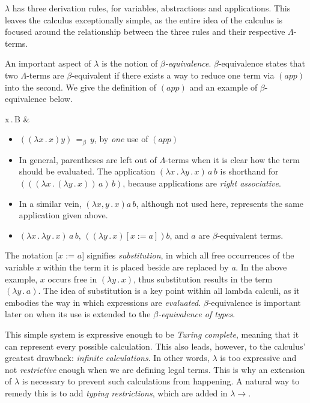 \documentclass[9pt,preprint,nocopyrightspace,computermodern]{sigplanconf} %
\begin{document}
\(\lambda\) has three derivation rules, for variables, abstractions and
applications. This leaves the calculus exceptionally simple, as the
entire idea of the calculus is focused around the relationship between the three
rules and their respective \mbox{\(\Lambda\)-terms.}

An important aspect of \(\lambda\) is the notion of \textit{\(\beta\)-equivalence}.
\(\beta\)-equivalence states that two \(\Lambda\)-terms are \(\beta\)-equivalent
if there exists a way to reduce one term via \((app)\) into the second.
We give the definition of \((app)\) and an example of \(\beta\)-equivalence below.

\begin{center}
        {\Gamma\vdash\lambda x\,.\,B & \Gamma\vdash\Lambda}\par
\end{center}

\begin{itemize}
\item \(((\lambda x\,.\,x)y)\,=_\beta\,y\), by \textit{one} use of \((app)\)
\item In general, parentheses are left out of \(\Lambda\)-terms when it is clear how
  the term should be evaluated. The application \((\lambda x\,.\,\lambda y\,.\,x)\,a\,b\)
  is shorthand for \((((\lambda x\,.\,(\lambda y\,.\,x))\,a)\,b)\), because
  applications are \textit{right associative}.
\item In a similar vein, \((\lambda x,y\,.\,x)a\,b\), although not used here,
  represents the same application given above.
\item \((\lambda x\,.\,\lambda y\,.\,x)\,a\,b,\,((\lambda y\,.\,x)[x := a])b\),
  and \(a\) are \mbox{\(\beta\)-equivalent} terms.
\end{itemize}
The notation [\(x\) := \(a\)] signifies \textit{substitution}, in which all free
occurrences of the variable \textit{x} within the term it is placed beside are
replaced by \textit{a}. In the above example, \(x\) occurs free in \((\lambda y\,.\,x)\),
thus substitution results in the term \((\lambda y\,.\,a)\). The idea of substitution
is a key point within all lambda calculi, as it embodies the way in which
expressions are  \textit{evaluated}. \mbox{\(\beta\)-equivalence} is important
later on when its use is extended to the \textit{\(\beta\)-equivalence of types}.

This simple system is expressive enough to be \textit{Turing complete}, meaning that
it can represent every possible calculation. This also leads, however, to the
calculus' greatest drawback: \textit{infinite calculations}. In other words,
\(\lambda\) is too expressive and not \textit{restrictive} enough when we are
defining legal terms. This is why an extension of \(\lambda\) is necessary to prevent
such calculations from happening. A natural way to remedy this is to add
\textit{typing restrictions}, which are added in \(\lambda\!\!\rightarrow\).
\end{document}
